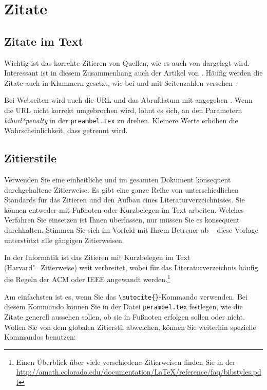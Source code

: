 \section{Zitate}

\subsection{Zitate im Text}

Wichtig ist das korrekte Zitieren von Quellen, wie es auch von \cite{Kornmeier2011} dargelegt wird. Interessant ist in diesem Zusammenhang auch der Artikel von \cite{Kramer2009}. Häufig werden die Zitate auch in Klammern gesetzt, wie bei \parencite{Kornmeier2011} und mit Seitenzahlen versehen \parencite[S. 22--24]{Kornmeier2011}.

Bei Webseiten wird auch die URL und das Abrufdatum mit angegeben \parencite{Gao2017}. Wenn die URL nicht korrekt umgebrochen wird, lohnt es sich, an den Parametern \textit{biburl*penalty} in der \texttt{preambel.tex} zu drehen. Kleinere Werte erhöhen die Wahrscheinlichkeit, dass getrennt wird.

\subsection{Zitierstile}

Verwenden Sie eine einheitliche und im gesamten Dokument konsequent durchgehaltene Zitierweise. Es gibt eine ganze Reihe von unterschiedlichen Standards für das Zitieren und den Aufbau eines Literaturverzeichnisses. Sie können entweder mit Fußnoten oder Kurzbelegen im Text arbeiten. Welches Verfahren Sie einsetzen ist Ihnen überlassen, nur müssen Sie es konsequent durchhalten. Stimmen Sie sich im Vorfeld mit Ihrem Betreuer ab -- diese Vorlage unterstützt alle gängigen Zitierweisen.

In der Informatik ist das Zitieren mit Kurzbelegen im Text (Harvard"=Zitierweise) weit verbreitet, wobei für das Literaturverzeichnis häufig die Regeln der \acs{ACM} oder \acs{IEEE} angewandt werden.\footnote{Einen Überblick über viele verschiedene Zitierweisen finden Sie in der \url{http://amath.colorado.edu/documentation/LaTeX/reference/faq/bibstyles.pdf}}

Am einfachsten ist es, wenn Sie das \verb+\autocite{}+-Kommando verwenden. Bei diesem Kommando können Sie in der Datei \texttt{perambel.tex} festlegen, wie die Zitate generell aussehen sollen, \zb{} ob sie in Fußnoten erfolgen sollen oder nicht. Wollen Sie von dem globalen Zitierstil abweichen, können Sie weiterhin spezielle Kommandos benutzen:

